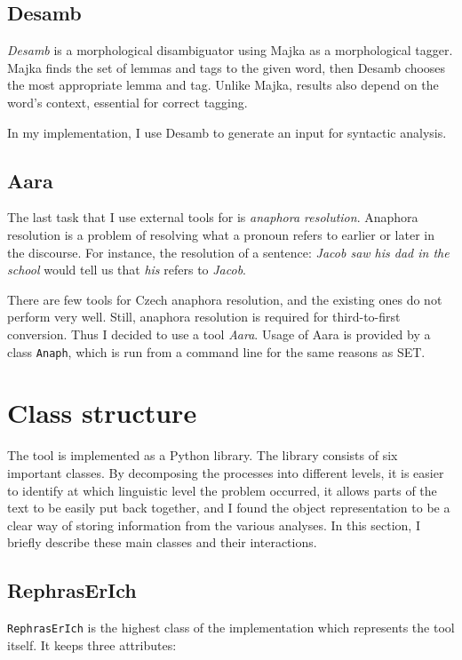 \subsection{Desamb}

\emph{Desamb} is a morphological disambiguator using Majka as a morphological tagger. Majka finds the set of lemmas and tags to the given word, then Desamb chooses the most appropriate lemma and tag. Unlike Majka, results also depend on the word's context, essential for correct tagging.

In my implementation, I use Desamb to generate an input for syntactic analysis.

\subsection{Aara}

The last task that I use external tools for is \emph{anaphora resolution}. Anaphora resolution is a problem of resolving what a pronoun refers to earlier or later in the discourse. For instance, the resolution of a sentence: \emph{Jacob saw his dad in the school} would tell us that \emph{his} refers to \emph{Jacob}.

There are few tools for Czech anaphora resolution, and the existing ones do not perform very well. Still, anaphora resolution is required for third-to-first conversion. Thus I decided to use a tool \emph{Aara}. Usage of Aara is provided by a class \texttt{Anaph}, which is run from a command line for the same reasons as SET.

\section{Class structure}

The tool is implemented as a Python library. The library consists of six important classes. By decomposing the processes into different levels, it is easier to identify at which linguistic level the problem occurred, it allows parts of the text to be easily put back together, and I found the object representation to be a clear way of storing information from the various analyses. In this section, I briefly describe these main classes and their interactions.

\subsection{RephrasErIch}

\texttt{RephrasErIch} is the highest class of the implementation which represents the tool itself. It keeps three attributes:

